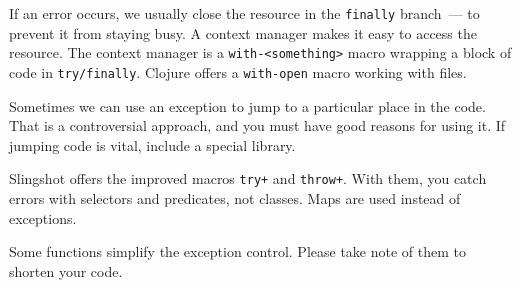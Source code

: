 If an error occurs, we usually close the resource in the \verb|finally| branch~--- to prevent it from staying busy. A context manager makes it easy to access the resource. The context manager is a \verb|with-<something>| macro wrapping a block of code in \verb|try/finally|. Clojure offers a \verb|with-open| macro working with files.

Sometimes we can use an exception to jump to a particular place in the code. That is a controversial approach, and you must have good reasons for using it. If jumping code is vital, include a special library.

Slingshot offers the improved macros \verb|try+| and \verb|throw+|. With them, you catch errors with selectors and predicates, not classes. Maps are used instead of exceptions.

Some functions simplify the exception control. Please take note of them to shorten your code.
